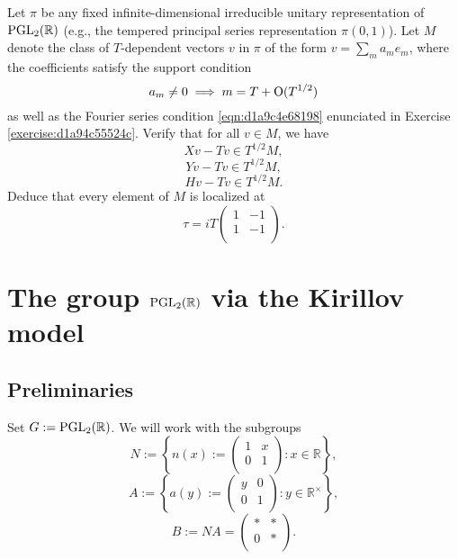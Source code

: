 \documentclass[reqno]{amsart} 
\numberwithin{equation}{section}
\begin{document}
\begin{exercise}
  Let $\pi$ be any fixed infinite-dimensional irreducible unitary representation of $\operatorname{PGL}_2(\mathbb{R})$ (e.g., the tempered principal series representation $\pi(0,1)$).  Let $M$ denote the class of $T$-dependent vectors $v$ in $\pi$ of the form $v = \sum_m a_m e_m$, where the coefficients satisfy the support condition
  \begin{equation*}
a_m \neq 0 \implies m = T+ \operatorname{O}(T^{1/2})
\end{equation*}
as well as the Fourier series condition \eqref{eqn:d1a9c4e68198} enunciated in Exercise \ref{exercise:d1a94c55524c}.  Verify that for all $v \in M$, we have
\begin{equation*}
X v - T v \in T^{1/2} M,
\end{equation*}
\begin{equation*}
Y v - T v \in T^{1/2} M,
\end{equation*}
\begin{equation*}
H v - T v \in T^{1/2} M.
\end{equation*}
Deduce that every element of $M$ is localized at
\begin{equation*}
 \tau =  i T
\begin{pmatrix}
  1 & -1 \\
  1 & -1 \\
\end{pmatrix}.
\end{equation*}
\end{exercise}

\section{The group $\operatorname{PGL}_2(\mathbb{R})$ via the Kirillov model}\label{sec:d1a9162e9d89}

\subsection{Preliminaries}\label{sec:d1a9162e9385}
Set $G := \operatorname{PGL}_2(\mathbb{R})$.  We will work with the subgroups
\begin{equation*}
N := \left\{ n(x) :=
  \begin{pmatrix}
1 & x \\
0 & 1 \\
\end{pmatrix} : x \in \mathbb{R}  \right\},
\end{equation*}
\begin{equation*}
  A :=
\left\{   a(y) := 
\begin{pmatrix}
y  & 0 \\
0 & 1 \\
\end{pmatrix} : y \in \mathbb{R}^\times  \right\},
\end{equation*}
\begin{equation*}
  B := N A
=
\begin{pmatrix}
\ast & \ast \\
0 & \ast \\
\end{pmatrix}.  
\end{equation*}
\end{document}
